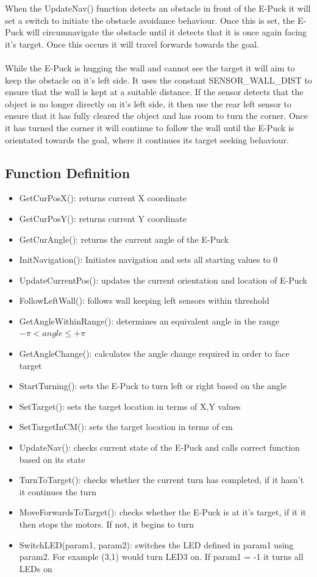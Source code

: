 \documentclass[11pt]{article}
\begin{document}
When the UpdateNav() function detects an obstacle in front of the E-Puck it will set a switch to initiate the obstacle avoidance behaviour. Once this is set, the E-Puck will circumnavigate the obstacle until it detects that it is once again facing it's target. Once this occurs it will travel forwards towards the goal.
\\
\\
While the E-Puck is hugging the wall and cannot see the target it will aim to keep the obstacle on it's left side. It uses the constant SENSOR\_WALL\_DIST to ensure that the wall is kept at a suitable distance. If the sensor detects that the object is no longer directly on it's left side, it then use the rear left sensor to ensure that it has fully cleared the object and has room to turn the corner. Once it has turned the corner it will continue to follow the wall until the E-Puck is orientated towards the goal, where it continues its target seeking behaviour.

\subsection*{Function Definition}

\begin{itemize}
\item{GetCurPosX(): returns current X coordinate}
\item{GetCurPosY(): returns current Y coordinate}
\item{GetCurAngle(): returns the current angle of the E-Puck}
\item{InitNavigation(): Initiates navigation and sets all starting values to 0}
\item{UpdateCurrentPos(): updates the current orientation and location of E-Puck}
\item{FollowLeftWall(): follows wall keeping left sensors within threshold}
\item{GetAngleWithinRange(): determines an equivalent angle in the range \begin{math}-\pi < angle \leq +\pi\end{math}}
\item{GetAngleChange(): calculates the angle change required in order to face target}
\item{StartTurning(): sets the E-Puck to turn left or right based on the angle}
\item{SetTarget(): sets the target location in terms of X,Y values}
\item{SetTargetInCM(): sets the target location in terms of cm}
\item{UpdateNav(): checks current state of the E-Puck and calls correct function based on its state}
\item{TurnToTarget(): checks whether the current turn has completed, if it hasn't it continues the turn}
\item{MoveForwardsToTarget(): checks whether the E-Puck is at it's target, if it it then stops the motors. If not, it begins to turn}
\item{SwitchLED(param1, param2): switches the LED defined in param1 using param2. For example (3,1) would turn LED3 on. If param1 = -1 it turns all LEDs on}
\end{itemize}
\end{document}
